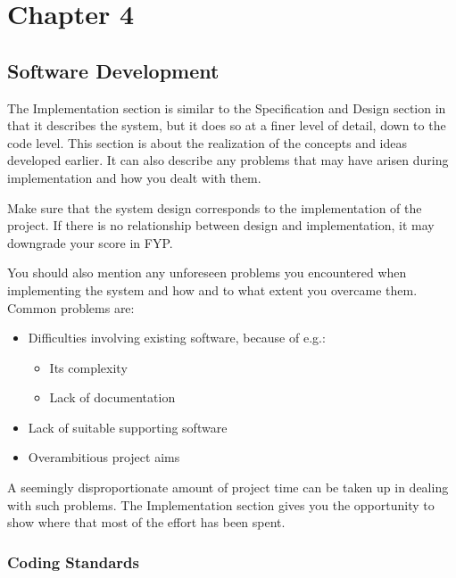 


\setcounter{chapter}{4}
\setcounter{figure}{0}
\setcounter{table}{0}
\chapter*{Chapter 4}
\section{Software Development}

The Implementation section is similar to the Specification and Design section in that it describes the system, but it does so at a finer level of detail, down to the code level. This section is about the realization of the concepts and ideas developed earlier. It can also describe any problems that may have arisen during implementation and how you dealt with them.

Make sure that the system design corresponds to the implementation of the project. If there is no relationship between design and implementation, it may downgrade your score in FYP.

You should also mention any unforeseen problems you encountered when implementing the system and how and to what extent you overcame them. Common problems are:

\begin{itemize}
  \item Difficulties involving existing software, because of e.g.:
    \begin{itemize}
      \item Its complexity
      \item Lack of documentation
    \end{itemize}
  \item Lack of suitable supporting software
  \item Overambitious project aims
\end{itemize}

A seemingly disproportionate amount of project time can be taken up in dealing with such problems. The Implementation section gives you the opportunity to show where that most of the effort has been spent.

\subsection{Coding Standards}

